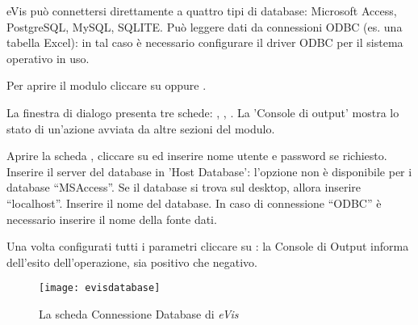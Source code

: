 eVis può connettersi direttamente a quattro tipi di database: Microsoft Access, PostgreSQL, MySQL, SQLITE.
Può leggere dati da connessioni ODBC (es. una tabella Excel): in tal caso è necessario configurare il driver ODBC 
per il sistema operativo in uso.

\label{evis_launch_database}

Per aprire il modulo cliccare su  oppure  \arrow 
{} \arrow {}. 

La finestra di dialogo  presenta tre schede: , ,
. 
La 'Console di output' mostra lo stato di un'azione avviata da altre sezioni del modulo.

\label{evis_connect_database}

Aprire la scheda ,  cliccare su  ed inserire 
nome utente e password se richiesto. Inserire il server del database in 'Host Database': l'opzione 
non è disponibile per i database ``MSAccess''. Se il database si trova sul desktop, allora inserire 
``localhost''. Inserire il nome del database. In caso di connessione ``ODBC'' è necessario inserire il
nome della fonte dati.

Una volta configurati tutti i parametri cliccare su : la Console di Output informa 
dell'esito dell'operazione, sia positivo che negativo. 

\begin{figure}[ht]
   \centering
   \texttt{[image: evisdatabase]}
   \caption{La scheda Connessione Database di \emph{eVis} \wincaption}\label{evisdatabase}
\end{figure}


